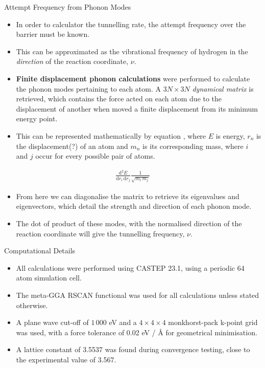 \documentclass[final]{beamer}
\renewcommand{\d}{\textrm{d}}
\newlength{\colwidth}
\begin{document}
\begin{frame}[t]
\begin{columns}[t]
\begin{column}{\colwidth}
  \begin{block}{Attempt Frequency from Phonon Modes}
    \begin{itemize}
        \item In order to calculator the tunnelling rate, the attempt frequency over the barrier must be known.
        \item This can be approximated as the vibrational frequency of hydrogen in the \emph{direction} of the reaction coordinate, $\nu$.
        \item \textbf{Finite displacement phonon calculations} were performed to calculate the phonon modes pertaining to each atom. A $3N\times3N$ \emph{dynamical matrix} is retrieved, which contains the force acted on each atom due to the displacement of another when moved a finite displacement from its minimum energy point.
        \item This can be represented mathematically by equation , where $E$ is energy, $r_n$ is the displacement(?) of an atom and $m_n$ is its corresponding mass, where $i$ and $j$ occur for every possible pair of atoms.
    \end{itemize}
    \begin{align*}
        \frac{{\d}^2E}{{\d}r_i\,{\d}r_j}\frac{1}{\sqrt{m_i\,m_j}}
    \end{align*}
    \begin{itemize}
        \item From here we can diagonalise the matrix to retrieve its eigenvalues and eigenvectors, which detail the strength and direction of each phonon mode.
        \item The dot of product of these modes, with the normalised direction of the reaction coordinate will give the tunnelling frequency, $\nu$.
    \end{itemize}

  \end{block}

  \begin{alertblock}{Computational Details}
    \begin{itemize}
        \item All calculations were performed using CASTEP 23.1, using a periodic 64 atom simulation cell.
        \item The meta-GGA RSCAN functional was used for all calculations unless stated otherwise. 
        \item A plane wave cut-off of $1\,000$ eV and a $4\times 4\times 4$ monkhorst-pack k-point grid was used, with a force tolerance of 0.02 eV / {\AA} for geometrical minimisation.
        \item A lattice constant of 3.5537 was found during convergence testing, close to the experimental value of 3.567.
    \end{itemize}


\end{alertblock}
\end{column}
\end{columns}
\end{frame}
\end{document}
